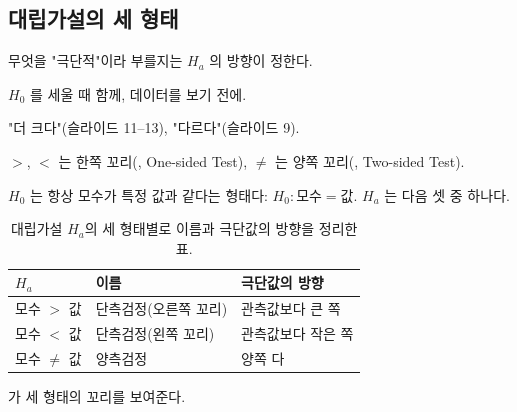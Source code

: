 \subsection{대립가설의 세 형태}
\label{sec:ht-forms}

\begin{inbrief}
  \item[Why] 무엇을 "극단적"이라 부를지는 $H_a$ 의 방향이 정한다.
  \item[When] $H_0$ 를 세울 때 함께, 데이터를 보기 전에.
  \item[Where] "더 크다"(슬라이드 11--13), "다르다"(슬라이드 9).
  \item[How] $>$, $<$ 는 한쪽 꼬리(, One-sided Test), $\neq$
             는 양쪽 꼬리(, Two-sided Test).
\end{inbrief}

$H_0$ 는 항상 모수가 특정 값과 같다는 형태다: $H_0: \text{모수} = \text{값}$.
$H_a$ 는 다음 셋 중 하나다.

\begin{table}[H]\centering
\caption{대립가설 $H_a$의 세 형태별로 이름과 극단값의 방향을 정리한 표.}
\label{tab:ht-alternative-forms}
\begin{tabular}{@{}lll@{}}
\toprule
$H_a$ & 이름 & 극단값의 방향 \\
\midrule
모수 $>$ 값 & 단측검정(오른쪽 꼬리) & 관측값보다 큰 쪽 \\
\midrule
모수 $<$ 값 & 단측검정(왼쪽 꼬리) & 관측값보다 작은 쪽 \\
\midrule
모수 $\neq$ 값 & 양측검정 & 양쪽 다 \\
\bottomrule
\end{tabular}
\end{table}

가 세 형태의 꼬리를 보여준다.

